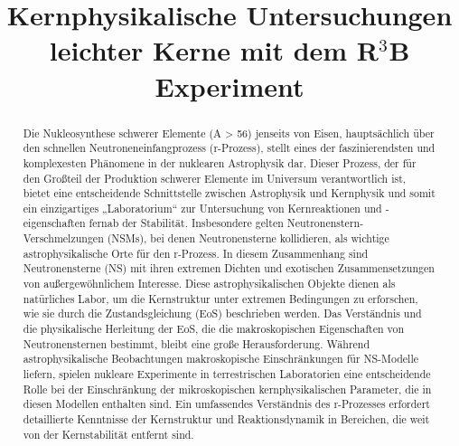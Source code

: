 \documentclass[12pt, a4paper]{article}
\date{}
\title{\vspace{-5cm}Kernphysikalische Untersuchungen leichter Kerne mit dem R$^3$B Experiment}
\begin{document}
\maketitle

\begin{abstract}
Die Nukleosynthese schwerer Elemente (A > 56) jenseits von Eisen, hauptsächlich über den schnellen Neutroneneinfangprozess (r-Prozess), stellt eines der faszinierendsten und komplexesten Phänomene in der nuklearen Astrophysik dar. Dieser Prozess, der für den Großteil der Produktion schwerer Elemente im Universum verantwortlich ist, bietet eine entscheidende Schnittstelle zwischen Astrophysik und Kernphysik und somit ein einzigartiges „Laboratorium“ zur Untersuchung von Kernreaktionen und -eigenschaften fernab der Stabilität. Insbesondere gelten Neutronenstern-Verschmelzungen (NSMs), bei denen Neutronensterne kollidieren, als wichtige astrophysikalische Orte für den r-Prozess. In diesem Zusammenhang sind Neutronensterne (NS) mit ihren extremen Dichten und exotischen Zusammensetzungen von außergewöhnlichem Interesse. Diese astrophysikalischen Objekte dienen als natürliches Labor, um die Kernstruktur unter extremen Bedingungen zu erforschen, wie sie durch die Zustandsgleichung (EoS) beschrieben werden. Das Verständnis und die physikalische Herleitung der EoS, die die makroskopischen Eigenschaften von Neutronensternen bestimmt, bleibt eine große Herausforderung. Während astrophysikalische Beobachtungen makroskopische Einschränkungen für NS-Modelle liefern, spielen nukleare Experimente in terrestrischen Laboratorien eine entscheidende Rolle bei der Einschränkung der mikroskopischen kernphysikalischen Parameter, die in diesen Modellen enthalten sind. Ein umfassendes Verständnis des r-Prozesses erfordert detaillierte Kenntnisse der Kernstruktur und Reaktionsdynamik in Bereichen, die weit von der Kernstabilität entfernt sind.


\end{abstract}
\end{document}
